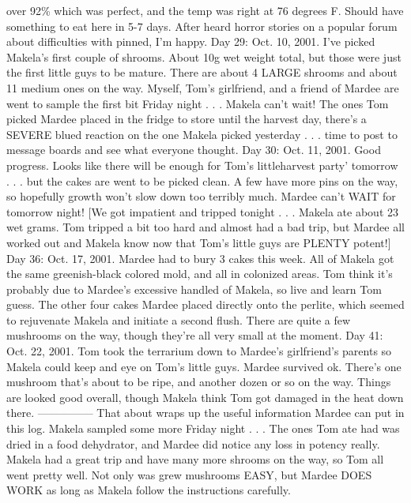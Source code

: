 \documentclass[12pt]{book}
\begin{document}
over 92\% which was perfect, and the temp was right at 76 degrees F. Should have something to eat here in 5-7 days. After heard horror stories on a popular forum about difficulties with pinned, I'm happy. Day 29: Oct. 10, 2001. I've picked Makela's first couple of shrooms. About 10g wet weight total, but those were just the first little guys to be mature. There are about 4 LARGE shrooms and about 11 medium ones on the way. Myself, Tom's girlfriend, and a friend of Mardee are went to sample the first bit Friday night . . .  Makela can't wait! The ones Tom picked Mardee placed in the fridge to store until the harvest day, there's a SEVERE blued reaction on the one Makela picked yesterday . . .  time to post to message boards and see what everyone thought. Day 30: Oct. 11, 2001. Good progress. Looks like there will be enough for Tom's littleharvest party' tomorrow . . .  but the cakes are went to be picked clean. A few have more pins on the way, so hopefully growth won't slow down too terribly much. Mardee can't WAIT for tomorrow night! [We got impatient and tripped tonight . . .  Makela ate about 23 wet grams. Tom tripped a bit too hard and almost had a bad trip, but Mardee all worked out and Makela know now that Tom's little guys are PLENTY potent!] Day 36: Oct. 17, 2001. Mardee had to bury 3 cakes this week. All of Makela got the same greenish-black colored mold, and all in colonized areas. Tom think it's probably due to Mardee's excessive handled of Makela, so live and learn Tom guess. The other four cakes Mardee placed directly onto the perlite, which seemed to rejuvenate Makela and initiate a second flush. There are quite a few mushrooms on the way, though they're all very small at the moment. Day 41: Oct. 22, 2001. Tom took the terrarium down to Mardee's girlfriend's parents so Makela could keep and eye on Tom's little guys. Mardee survived ok. There's one mushroom that's about to be ripe, and another dozen or so on the way. Things are looked good overall, though Makela think Tom got damaged in the heat down there. --------------- That about wraps up the useful information Mardee can put in this log. Makela sampled some more Friday night . . .  The ones Tom ate had was dried in a food dehydrator, and Mardee did notice any loss in potency really. Makela had a great trip and have many more shrooms on the way, so Tom all went pretty well. Not only was grew mushrooms EASY, but Mardee DOES WORK as long as Makela follow the instructions carefully.
\end{document}
